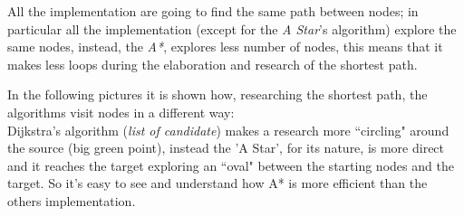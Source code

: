 \documentclass[a4paper,11pt]{report}
\begin{document}
All the implementation are going to find the same path between nodes; in particular all the implementation (except for the \textit{A Star}'s algorithm) explore the same nodes, instead, the \textit{A*}, explores less number of nodes, this means that it makes less loops during the elaboration and research of the shortest path.

In the following pictures it is shown how, researching the shortest path, the algorithms visit nodes in a different way:\\
Dijkstra's algorithm (\textit{list of candidate}) makes a research more ``circling" around the source (big green point), instead the 'A Star', for its nature, is more direct and it reaches the target exploring an ``oval" between the starting nodes and the target. So it's easy to see and understand how A* is more efficient than the others implementation.\\
  
\end{document}
